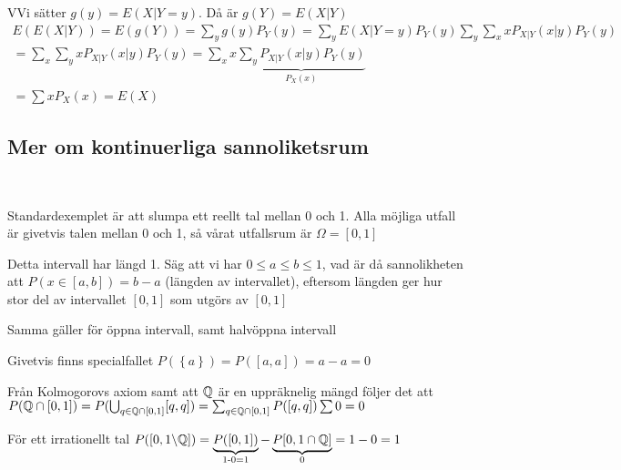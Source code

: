 \newpage
\begin{prf}
  VVi sätter $g(y) = E(X|Y=y)$. Då är $g(Y) = E(X|Y)$
  \begin{equation*}
    \begin{gathered}
      E(E(X|Y)) = E(g(Y)) = \sum_y g(y)P_Y(y) = \sum_y E(X|Y=y)P_Y(y)\sum_y\sum_xxP_{X|Y}(x|y)P_Y(y)\\
      =\sum_x\sum_yxP_{X|Y}(x|y)P_Y(y) =\sum_xx\underbrace{\sum_yP_{X|Y}(x|y)P_Y(y)}_{\text{$P_X(x)$}}\\
      =\sum xP_X(x)=E(X)
    \end{gathered}
  \end{equation*}
\end{prf}
\par\bigskip
\subsection{Mer om kontinuerliga sannoliketsrum}\hfill\\\par
\noindent Standardexemplet är att slumpa ett reellt tal mellan 0 och 1. Alla möjliga utfall är givetvis talen mellan 0 och 1, så vårat utfallsrum är $\Omega=[0,1]$\par
\noindent Detta intervall har längd 1. Säg att vi har $0\leq a\leq b\leq 1$, vad är då sannolikheten att $P(x\in [a,b]) = b-a$ (längden av intervallet), eftersom längden ger hur stor del av intervallet $[0,1]$ som utgörs av $[0,1]$
\par\bigskip
\noindent Samma gäller för öppna intervall, samt halvöppna intervall\par
\noindent Givetvis finns specialfallet $P(\left\{a\right\})=P([a,a])=a-a=0$
\par\bigskip
\noindent Från Kolmogorovs axiom samt att $\mathbb{Q}$ är en uppräknelig mängd följer det att $P(\mathbb{Q}\cap [0,1]) = P(\bigcup_{q\in\mathbb{Q}\cap[0,1]}[q,q]) = \sum_{q\in\mathbb{Q}\cap[0,1]}P([q,q])\sum0=0$
\par\bigskip
\noindent För ett irrationellt tal $P([0,1\backslash\mathbb{Q}]) = \underbrace{P([0,1])}_{\text{1-0=1}}-\underbrace{P[0,1\cap\mathbb{Q}]}_{\text{0}} = 1-0=1$
\par\bigskip
